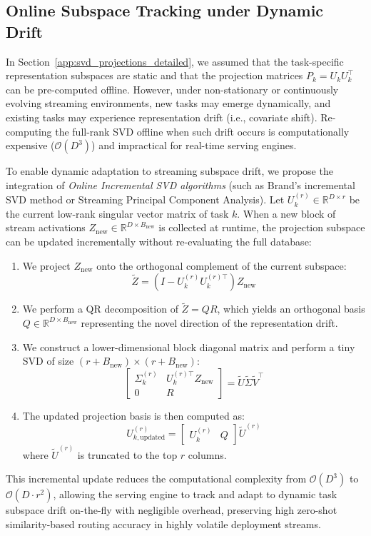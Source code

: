 \documentclass{article}
\theoremstyle{plain}
\theoremstyle{definition}
\theoremstyle{remark}
\begin{document}
\subsection{Online Subspace Tracking under Dynamic Drift}
In Section~\ref{app:svd_projections_detailed}, we assumed that the task-specific representation subspaces are static and that the projection matrices $P_k = U_k U_k^\top$ can be pre-computed offline. However, under non-stationary or continuously evolving streaming environments, new tasks may emerge dynamically, and existing tasks may experience representation drift (i.e., covariate shift). Re-computing the full-rank SVD offline when such drift occurs is computationally expensive ($\mathcal{O}(D^3)$) and impractical for real-time serving engines. 

To enable dynamic adaptation to streaming subspace drift, we propose the integration of \emph{Online Incremental SVD algorithms} (such as Brand's incremental SVD method or Streaming Principal Component Analysis). Let $U_k^{(r)} \in \mathbb{R}^{D \times r}$ be the current low-rank singular vector matrix of task $k$. When a new block of stream activations $Z_{\text{new}} \in \mathbb{R}^{D \times B_{\text{new}}}$ is collected at runtime, the projection subspace can be updated incrementally without re-evaluating the full database:
\begin{enumerate}
    \item We project $Z_{\text{new}}$ onto the orthogonal complement of the current subspace:
    \begin{equation}
    \tilde{Z} = (I - U_k^{(r)} U_k^{(r)\top}) Z_{\text{new}}
    \end{equation}
    \item We perform a QR decomposition of $\tilde{Z} = Q R$, which yields an orthogonal basis $Q \in \mathbb{R}^{D \times B_{\text{new}}}$ representing the novel direction of the representation drift.
    \item We construct a lower-dimensional block diagonal matrix and perform a tiny SVD of size $(r + B_{\text{new}}) \times (r + B_{\text{new}})$:
    \begin{equation}
    \begin{bmatrix} \Sigma_k^{(r)} & U_k^{(r)\top} Z_{\text{new}} \\ 0 & R \end{bmatrix} = \tilde{U} \tilde{\Sigma} \tilde{V}^\top
    \end{equation}
    \item The updated projection basis is then computed as:
    \begin{equation}
    U_{k, \text{updated}}^{(r)} = \begin{bmatrix} U_k^{(r)} & Q \end{bmatrix} \tilde{U}^{(r)}
    \end{equation}
    where $\tilde{U}^{(r)}$ is truncated to the top $r$ columns.
\end{enumerate}
This incremental update reduces the computational complexity from $\mathcal{O}(D^3)$ to $\mathcal{O}(D \cdot r^2)$, allowing the serving engine to track and adapt to dynamic task subspace drift on-the-fly with negligible overhead, preserving high zero-shot similarity-based routing accuracy in highly volatile deployment streams.
\end{document}
